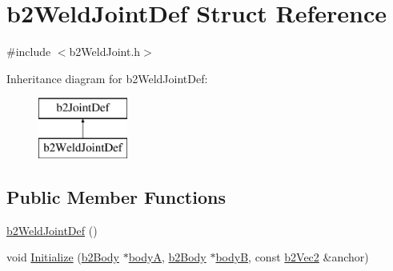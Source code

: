 \hypertarget{structb2_weld_joint_def}{}\section{b2\+Weld\+Joint\+Def Struct Reference}
\label{structb2_weld_joint_def}


{\ttfamily \#include $<$b2\+Weld\+Joint.\+h$>$}

Inheritance diagram for b2\+Weld\+Joint\+Def\+:\begin{figure}[H]
\begin{center}
\leavevmode
\includegraphics[height=2.000000cm]{structb2_weld_joint_def}
\end{center}
\end{figure}
\subsection*{Public Member Functions}
\begin{DoxyCompactItemize}
\item 
\mbox{\hyperlink{structb2_weld_joint_def_a18f4a2f33109edc37a3a977c6296bc31}{b2\+Weld\+Joint\+Def}} ()
\item 
void \mbox{\hyperlink{structb2_weld_joint_def_a9f6592c2a7eba6ce6e07e40c4e82aab5}{Initialize}} (\mbox{\hyperlink{classb2_body}{b2\+Body}} $\ast$\mbox{\hyperlink{structb2_joint_def_a8cd54c93da396be75a9788f2c6897f05}{bodyA}}, \mbox{\hyperlink{classb2_body}{b2\+Body}} $\ast$\mbox{\hyperlink{structb2_joint_def_aa4f4dee2fbcd12187b19506b60e68e3d}{bodyB}}, const \mbox{\hyperlink{structb2_vec2}{b2\+Vec2}} \&anchor)
\end{DoxyCompactItemize}
